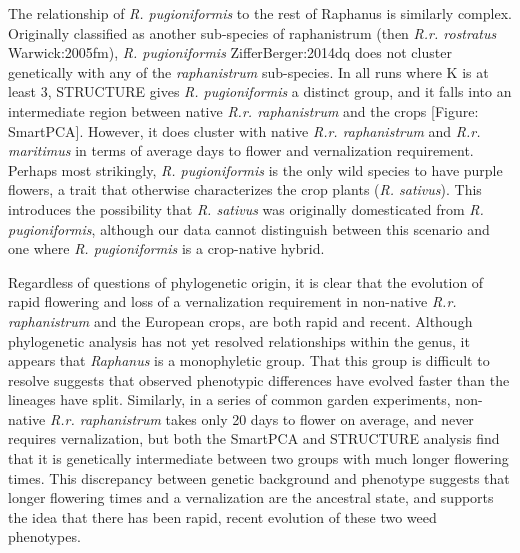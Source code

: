 \documentclass[twocolumn]{bmcart}%
\begin{document}
The relationship of \textit{R. pugioniformis} to the rest of Raphanus is similarly complex. Originally classified as another sub-species of raphanistrum (then \textit{R.r. rostratus} {Warwick:2005fm}), \textit{R. pugioniformis} {ZifferBerger:2014dq} does not cluster genetically with any of the \textit{raphanistrum} sub-species. In all runs where K is at least 3, STRUCTURE gives \textit{R. pugioniformis} a distinct group, and it falls into an intermediate region between native \textit{R.r. raphanistrum} and the crops [Figure: SmartPCA]. However, it does cluster with native \textit{R.r. raphanistrum} and \textit{R.r. maritimus} in terms of average days to flower and vernalization requirement. Perhaps most strikingly, \textit{R. pugioniformis} is the only wild species to have purple flowers, a trait that otherwise characterizes the crop plants (\textit{R. sativus}). This introduces the possibility that \textit{R. sativus} was originally domesticated from \textit{R. pugioniformis}, although our data cannot distinguish between this scenario and one where \textit{R. pugioniformis} is a crop-native hybrid.

Regardless of questions of phylogenetic origin, it is clear that the evolution of rapid flowering and loss of a vernalization requirement in non-native \textit{R.r. raphanistrum} and the European crops, are both rapid and recent. Although phylogenetic analysis has not yet resolved relationships within the genus, it appears that \textit{Raphanus} is a monophyletic group. That this group is difficult to resolve suggests that observed phenotypic differences have evolved faster than the lineages have split. Similarly, in a series of common garden experiments, non-native \textit{R.r. raphanistrum} takes only 20 days to flower on average, and never requires vernalization, but both the SmartPCA and STRUCTURE analysis find that it is genetically intermediate between two groups with much longer flowering times. This discrepancy between genetic background and phenotype suggests that longer flowering times and a vernalization are the ancestral state, and supports the idea that there has been rapid, recent evolution of these two weed phenotypes. 



\end{document}

